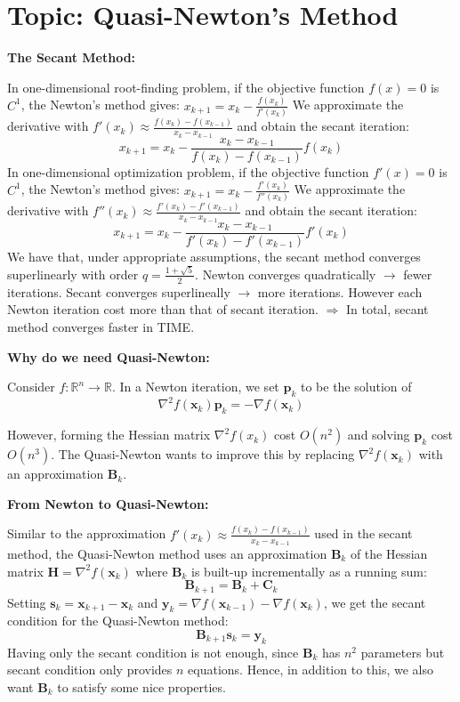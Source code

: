 \documentclass[11pt]{article}
\theoremstyle{plain} %
\newenvironment{topic}
{\color{C2}\normalfont\begin{framed}\begingroup }
  {\endgroup\end{framed}}
\theoremstyle{remark}
\newenvironment{remark}
  {\pushQED{\qed}\renewcommand{\qedsymbol}{$\triangle$}\remarkx}
  {\popQED\endremarkx}
\begin{document}
\newpage
\section{Topic: Quasi-Newton's Method}

\begin{topic}
  \textbf{The Secant Method:}

  In one-dimensional root-finding problem, if the objective function $f(x) = 0$ is $C^1$, the Newton's method gives:
  $
    x_{k+1} = x_k -\frac{f(x_k)}{f'(x_k)}
  $
  We approximate the derivative with $f'(x_k) \approx \frac{f(x_k) -
      f(x_{k-1})}{x_k - x_{k-1}}$ and obtain the secant iteration:
  $$
    x_{k+1} = x_k - \frac{x_k - x_{k-1}}{f(x_k) - f(x_{k-1})}f(x_k)
  $$
  In one-dimensional optimization problem, if the objective function $f'(x) = 0$ is $C^1$, the Newton's method gives:
  $
    x_{k+1} = x_k -\frac{f'(x_k)}{f''(x_k)}
  $
  We approximate the derivative with $f''(x_k) \approx \frac{f'(x_k) -
      f'(x_{k-1})}{x_k - x_{k-1}}$ and obtain the secant iteration:
  $$
    x_{k+1} = x_k - \frac{x_k - x_{k-1}}{f'(x_k) - f'(x_{k-1})}f'(x_k)
  $$
  We have that, under appropriate assumptions, the secant method
  converges superlinearly with order $q=\frac{1+\sqrt{5}}{2}$.
  \begin{remark}
    Newton converges quadratically $\rightarrow$ fewer iterations.
    Secant converges superlineally $\rightarrow$ more iterations.
    However each Newton iteration cost more
    than that of secant iteration.
    $\Rightarrow$ In total, secant method converges faster in TIME.
  \end{remark}

  \textbf{Why do we need Quasi-Newton:}

  Consider $f: \mathbb{R}^n \rightarrow \mathbb{R}$. In a Newton iteration, we set $\mathbf{p}_k$ to be the solution of
  $$
    \nabla^2 f\left(\mathbf{x}_k\right) \mathbf{p}_k =-\nabla f\left(\mathbf{x}_k\right)
  $$

  However, forming the Hessian matrix $\nabla^2 f\left(x_k\right)$ cost $O\left(n^2\right)$ and
  solving $\mathbf{p}_k$ cost $O\left(n^3\right)$. The Quasi-Newton wants to improve this by
  replacing $\nabla^2 f\left(\mathbf{x}_k\right)$ with an approximation $\mathbf{B}_k$.

  \textbf{From Newton to Quasi-Newton:}

  Similar to the approximation $f'(x_k) \approx \frac{f(x_k) -
      f(x_{k-1})}{x_k - x_{k-1}}$ used in the secant method, the Quasi-Newton method
  uses an approximation $\mathbf{B}_k$ of the Hessian matrix $\mathbf{H} = \nabla^2 f\left(\mathbf{x}_k\right)$
  where $\mathbf{B}_k$ is built-up incrementally as a running sum:
  $$
    \mathbf{B}_{k+1}=\mathbf{B}_k+\mathbf{C}_k
  $$
  Setting $\mathbf{s}_k=\mathbf{x}_{k+1}-\mathbf{x}_k$
  and $\mathbf{y}_k=\nabla f\left(\mathbf{x}_{k-1}\right)-\nabla f\left(\mathbf{x}_k\right)$, we get the secant
  condition for the Quasi-Newton method:
  $$
    \mathbf{B}_{k+1} \mathbf{s}_k=\mathbf{y}_k
  $$
  Having only the secant condition is not enough, since $\mathbf{B}_k$ has $n^2$ parameters but secant condition only provides
  $n$ equations. Hence, in addition to this, we also want $\mathbf{B}_k$ to satisfy some nice properties.


\end{topic}
\end{document}
